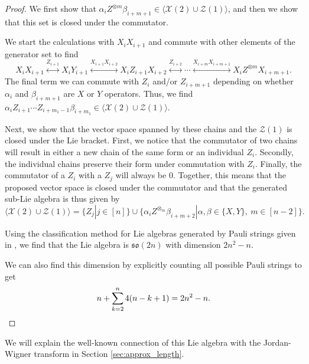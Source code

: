 \documentclass[12pt, a4-paper]{amsart}
\newcommand{\cX}{\mathcal{X}}
\newcommand{\cZ}{\mathcal{Z}}
\newcommand{\mf}[1]{\mathfrak{#1}}
\numberwithin{equation}{section}
\newcommand{\ten}{\otimes}
\begin{document}
\begin{proof}
We first show that $\alpha_i Z^{\otimes m} \beta_{i+m+1} \in \langle \cX(2) \cup \cZ(1)\rangle$, and then we show that this set is closed under the commutator. 

We start the calculations with $X_i X_{i+1}$ and commute with other elements of the generator set to find
\begin{equation}
    X_i X_{i+1} \stackrel{Z_{i+1}}{\longleftrightarrow}X_i Y_{i+1} \stackrel{X_{i+1}X_{i+2}}{\longleftrightarrow} X_i Z_{i+1} X_{i+2} \stackrel{Z_{i+2}}{\longleftrightarrow} \cdots \stackrel{X_{i+m} X_{i+m+1}}{\longleftrightarrow} X_i Z^{\otimes m} X_{i+m+1}.
\end{equation}
The final term we can commute with $Z_i$ and/or $Z_{i+m+1}$ depending on whether $\alpha_i$ and $\beta_{i+m+1}$ are $X$ or $Y$ operators. Thus, we find $\alpha_i Z_{i+1}\cdots Z_{i+m_1-1}\beta_{i+m_1} \in \langle \cX(2) \cup \cZ(1)\rangle$. 

Next, we show that the vector space spanned by these chains and the $\cZ(1)$ is closed under the Lie bracket. First, we notice that the commutator of two chains will result in either a new chain of the same form or an individual $Z_i$. Secondly, the individual chains preserve their form under commutation with $Z_i$. Finally, the commutator of a $Z_i$ with a $Z_j$ will always be 0. Together, this means that the proposed vector space is closed under the commutator and that the generated sub-Lie algebra is thus given by 
\begin{equation}
    \langle \cX(2) \cup \cZ(1) \rangle = \{Z_j|j \in [n]\} \cup \{\alpha_iZ^{\ten_m}\beta_{i+m+2}| \alpha, \beta \in \{X,Y\},~ m \in [n-2] \}.
\end{equation}

Using the classification method for Lie algebras generated by Pauli strings given in \cite{Aguilar2024FullClassificationLie}, we find that the Lie algebra is $\mf{so}(2n)$ with dimension $2n^2-n$.

We can also find this dimension by explicitly counting all possible Pauli strings to get
\begin{equation}
    n+\sum_{k=2}^{n}4(n-k+1) = 2n^2-n. \qedhere
\end{equation}
\end{proof}

We will explain the well-known connection of this Lie algebra with the Jordan-Wigner transform in Section \ref{sec:approx_length}.
\end{document}
